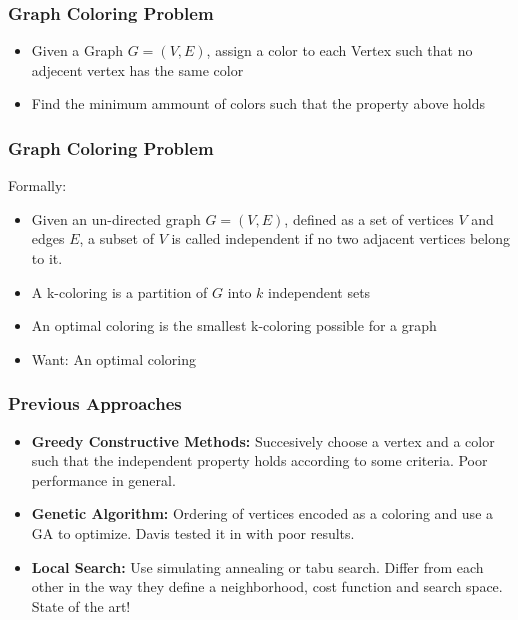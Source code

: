 \documentclass{beamer}
\begin{document}
\begin{frame}
\frametitle{Graph Coloring Problem}
\begin{itemize}
\item Given a Graph $G=(V,E)$, assign a color to each Vertex such that no adjecent vertex has the same color
\item Find the minimum ammount of colors such that the property above holds
\end{itemize}
\end{frame}

\begin{frame}
\frametitle{Graph Coloring Problem}
\large{Formally:}
\begin{itemize}
\item Given an un-directed graph $G=(V,E)$, defined as a set of vertices $V$ and edges $E$, a subset of $V$ is called independent if no two adjacent vertices belong to it.
\item A k-coloring is a partition of $G$ into $k$ independent sets
\item An optimal coloring is the smallest k-coloring possible for a graph
\item Want: An optimal coloring
\end{itemize}
\end{frame}

\begin{frame}
\frametitle{Previous Approaches}
\begin{itemize}
\item {\bf Greedy Constructive Methods:} Succesively choose a vertex and a color such that the independent property holds according to some criteria. Poor performance in general.
\item {\bf Genetic Algorithm:} Ordering of vertices encoded as a coloring and use a GA to optimize. Davis tested it in \cite{DavisGA} with poor results.
\item {\bf Local Search:} Use simulating annealing or tabu search. Differ from each other in the way they define a neighborhood, cost function and search space. State of the art!
\end{itemize}
\end{frame}
\end{document}
